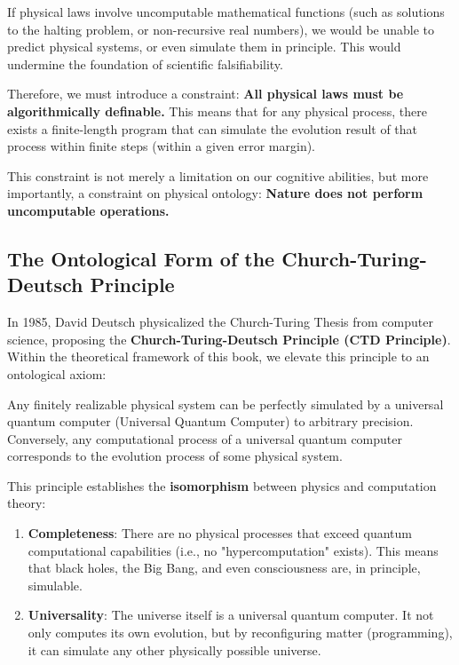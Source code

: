 If physical laws involve uncomputable mathematical functions (such as solutions to the halting problem, or non-recursive real numbers), we would be unable to predict physical systems, or even simulate them in principle. This would undermine the foundation of scientific falsifiability.

Therefore, we must introduce a constraint: \textbf{All physical laws must be algorithmically definable.} This means that for any physical process, there exists a finite-length program that can simulate the evolution result of that process within finite steps (within a given error margin).

This constraint is not merely a limitation on our cognitive abilities, but more importantly, a constraint on physical ontology: \textbf{Nature does not perform uncomputable operations.}

\subsection{The Ontological Form of the Church-Turing-Deutsch Principle}

In 1985, David Deutsch physicalized the Church-Turing Thesis from computer science, proposing the \textbf{Church-Turing-Deutsch Principle (CTD Principle)}. Within the theoretical framework of this book, we elevate this principle to an ontological axiom:

\begin{axiom}
Any finitely realizable physical system can be perfectly simulated by a universal quantum computer (Universal Quantum Computer) to arbitrary precision. Conversely, any computational process of a universal quantum computer corresponds to the evolution process of some physical system.
\end{axiom}

This principle establishes the \textbf{isomorphism} between physics and computation theory:

\begin{enumerate}
\item \textbf{Completeness}: There are no physical processes that exceed quantum computational capabilities (i.e., no "hypercomputation" exists). This means that black holes, the Big Bang, and even consciousness are, in principle, simulable.

\item \textbf{Universality}: The universe itself is a universal quantum computer. It not only computes its own evolution, but by reconfiguring matter (programming), it can simulate any other physically possible universe.
\end{enumerate}

